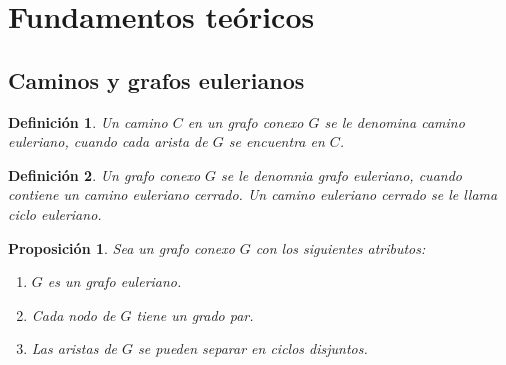 \documentclass[12pt]{article}
\newtheorem{definition}{Definición}
\newtheorem{lemma}{Proposición}
\begin{document}
\section{Fundamentos te\'{o}ricos}
\subsection{Caminos y grafos eulerianos}
\begin{definition}
Un camino $C$ en un grafo conexo $G$ se le denomina \emph{camino euleriano}, cuando cada arista de $G$ se encuentra en $C$.
\end{definition}
\begin{definition}
Un grafo conexo $G$ se le denomnia \emph{grafo euleriano}, cuando contiene un camino euleriano cerrado. Un camino euleriano cerrado se le llama ciclo euleriano.
\end{definition}
\begin{lemma}
Sea un grafo conexo $G$ con los siguientes atributos:
\begin{enumerate}
\item $G$ es un grafo euleriano.
\item Cada nodo de $G$ tiene un grado par.
\item Las aristas de $G$ se pueden separar en ciclos disjuntos.
\end{enumerate}
\end{lemma}
\end{document}
